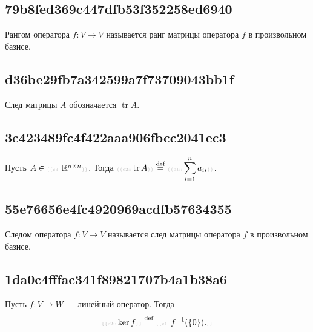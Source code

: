 \documentclass[11pt, a5paper]{article}
\newenvironment{note}[1]{\goodbreak\par\subsection{\hfill \color{lightgray}\tiny #1}}{}
\newenvironment{icloze}[2][\ldots]{%
  \ignorespaces\text{\tiny \color{lightgray} \{\{c#2::}\hspace{0pt}%
}{%
  \hspace{0pt}\text{\tiny \color{lightgray}\}\}}\unskip%
}
\begin{document}
\begin{note}{79b8fed369c447dfb53f352258ed6940}
    \begin{icloze}{2}Рангом оператора \( f : V \to V \)\end{icloze} называется \begin{icloze}{1}ранг матрицы оператора \( f \) в произвольном базисе.\end{icloze}
\end{note}

\begin{note}{d36be29fb7a342599a7f73709043bb1f}
    \begin{icloze}{2}След матрицы \( A \)\end{icloze} обозначается \begin{icloze}{1}\( \operatorname{tr}  A \).\end{icloze}
\end{note}

\begin{note}{3c423489fc4f422aaa906fbcc2041ec3}
    Пусть \( A \in \begin{icloze}{3}\mathbb R ^{n \times n}\end{icloze} \). Тогда \( \displaystyle \begin{icloze}{2}\operatorname{tr} A\end{icloze} \overset{\text{def}}= \begin{icloze}{1}\sum_{i=1}^{n} a_{ii}\end{icloze} \).
\end{note}

\begin{note}{55e76656e4fc4920969acdfb57634355}
    \begin{icloze}{2}Следом оператора \( f : V \to V \)\end{icloze} называется \begin{icloze}{1}след матрицы оператора \( f \) в произвольном базисе.\end{icloze}
\end{note}

\begin{note}{1da0c4fffac341f89821707b4a1b38a6}
    Пусть \( f : V \to W \) --- линейный оператор. Тогда
    \[
        \begin{icloze}{2}\ker f\end{icloze} \overset{\text{def}}= \begin{icloze}{1}f^{-1}(\left\{ 0 \right\}).\end{icloze}
    \]
\end{note}
\end{document}

